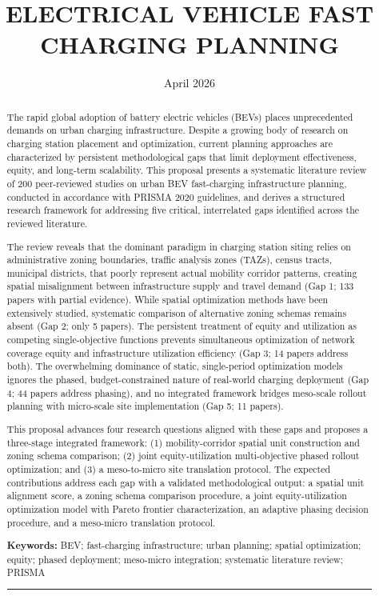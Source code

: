 \documentclass[letterpaper, 12pt, oneside, doublespacing]{Thesis}
\title{ELECTRICAL VEHICLE FAST CHARGING PLANNING}
\date{April 2026}
\begin{document}
\frontmatter
\maketitle

\fancyhead{}
\fancyfoot[C]{\thepage}
\pagestyle{fancy}

\begin{abstract}
The rapid global adoption of battery electric vehicles (BEVs) places unprecedented demands on urban charging infrastructure. Despite a growing body of research on charging station placement and optimization, current planning approaches are characterized by persistent methodological gaps that limit deployment effectiveness, equity, and long-term scalability. This proposal presents a systematic literature review of 200 peer-reviewed studies on urban BEV fast-charging infrastructure planning, conducted in accordance with PRISMA 2020 guidelines, and derives a structured research framework for addressing five critical, interrelated gaps identified across the reviewed literature.

The review reveals that the dominant paradigm in charging station siting relies on administrative zoning boundaries, traffic analysis zones (TAZs), census tracts, municipal districts, that poorly represent actual mobility corridor patterns, creating spatial misalignment between infrastructure supply and travel demand (Gap 1; 133 papers with partial evidence). While spatial optimization methods have been extensively studied, systematic comparison of alternative zoning schemas remains absent (Gap 2; only 5 papers). The persistent treatment of equity and utilization as competing single-objective functions prevents simultaneous optimization of network coverage equity and infrastructure utilization efficiency (Gap 3; 14 papers address both). The overwhelming dominance of static, single-period optimization models ignores the phased, budget-constrained nature of real-world charging deployment (Gap 4; 44 papers address phasing), and no integrated framework bridges meso-scale rollout planning with micro-scale site implementation (Gap 5; 11 papers).

This proposal advances four research questions aligned with these gaps and proposes a three-stage integrated framework: (1) mobility-corridor spatial unit construction and zoning schema comparison; (2) joint equity-utilization multi-objective phased rollout optimization; and (3) a meso-to-micro site translation protocol. The expected contributions address each gap with a validated methodological output: a spatial unit alignment score, a zoning schema comparison procedure, a joint equity-utilization optimization model with Pareto frontier characterization, an adaptive phasing decision procedure, and a meso-micro translation protocol.


\noindent \textbf{Keywords:} BEV; fast-charging infrastructure; urban planning; spatial optimization; equity; phased deployment; meso-micro integration; systematic literature review; PRISMA


\bigskip\noindent\rule{\linewidth}{0.4pt}\bigskip

\end{abstract}
\end{document}
